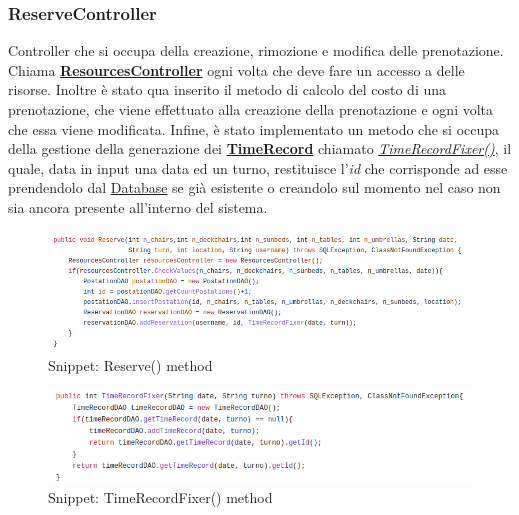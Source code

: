 \documentclass{article}
\begin{document}
{\subsubsection{ReserveController}\label{subsubsec:reservecontroller}
Controller che si occupa della creazione, rimozione e modifica delle prenotazione. Chiama \hyperref[subsubsec:resourcescontroller]{\textbf{ResourcesController}} ogni volta che deve fare un accesso a delle risorse. Inoltre è stato qua inserito il metodo di calcolo del costo di una prenotazione, che viene effettuato alla creazione della prenotazione e ogni volta che essa viene modificata. Infine, è stato implementato un metodo che si occupa della gestione della generazione dei \hyperref[subsec:timerecord]{\textbf{TimeRecord}} chiamato \hyperref[fig:fixer]{\textit{TimeRecordFixer()}}, il quale, data in input una data ed un turno, restituisce l'\textit{id} che corrisponde ad esse prendendolo dal \hyperref[subsec:Database]{Database} se già esistente o creandolo sul momento nel caso non sia ancora presente all'interno del sistema.
\begin{figure}[H]
                \centering
                \includegraphics[width=\textwidth]{Images/Snippets/Reserve.png}
                \caption{Snippet: Reserve() method}
                \label{fig:reserve}
            \end{figure}
\begin{figure}[H]
                \centering
                \includegraphics[width=\textwidth]{Images/Snippets/TimeRecordFixer.png}
                \caption{Snippet: TimeRecordFixer() method}
                \label{fig:fixer}
            \end{figure}
}
\end{document}
